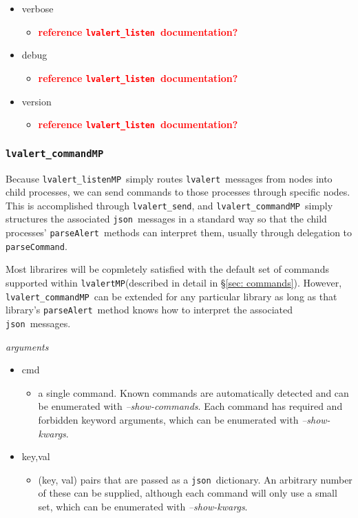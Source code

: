 \documentclass{article}
\newcommand{\FIXME}[1]{\textcolor{red}{\textbf{#1}}}
\newcommand{\alert}{\texttt{lvalert}}
\newcommand{\lvalertListen}{\texttt{lvalert\_listen}}
\newcommand{\lvalertSend}{\texttt{lvalert\_send}}
\newcommand{\lvalertMP}{\texttt{lvalertMP}}
\newcommand{\lvalertListenMP}{\texttt{lvalert\_listenMP}}
\newcommand{\lvalertCommandMP}{\texttt{lvalert\_commandMP}}
\newcommand{\parseAlert}{\texttt{parseAlert}}
\newcommand{\parseCommand}{\texttt{parseCommand}}
\newcommand{\json}{\texttt{json}}
\begin{document}
\begin{itemize}
{         }
    \item{verbose
        \begin{itemize}
            \item{\FIXME{reference \lvalertListen~documentation?}}
        \end{itemize}
         }
    \item{debug
        \begin{itemize}
            \item{\FIXME{reference \lvalertListen~documentation?}}
        \end{itemize}
         }
    \item{version
        \begin{itemize}
            \item{\FIXME{reference \lvalertListen~documentation?}}
        \end{itemize}
         }
\end{itemize}


\subsubsection{\lvalertCommandMP}
\label{sec: lvalertCommandMP}

Because \lvalertListenMP~simply routes \alert~messages from nodes into child processes, we can send commands to those processes through specific nodes.
This is accomplished through \lvalertSend, and \lvalertCommandMP~simply structures the associated \json~messages in a standard way so that the child processes' \parseAlert~methods can interpret them, usually through delegation to \parseCommand.

Most librarires will be copmletely satisfied with the default set of commands supported within \lvalertMP (described in detail in \S\ref{sec: commands}).
However, \lvalertCommandMP~can be extended for any particular library as long as that library's \parseAlert~method knows how to interpret the associated \json~messages.

\vspace{0.5cm}
\noindent
\textit{arguments}

\begin{itemize}
    \item{cmd
        \begin{itemize}
            \item{a single command. Known commands are automatically detected and can be enumerated with \textit{--show-commands}. Each command has required and forbidden keyword arguments, which can be enumerated with \textit{--show-kwargs}.}
        \end{itemize}
         }
    \item{key,val
        \begin{itemize}
            \item{(key, val) pairs that are passed as a \json~dictionary. An arbitrary number of these can be supplied, although each command will only use a small set, which can be enumerated with \textit{--show-kwargs}.}
        \end{itemize}
         }
\end{itemize}
\end{document}
